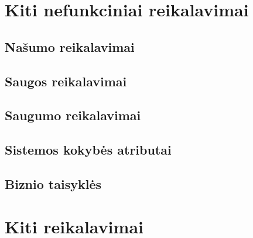\documentclass[oneside]{VUMIFPSkursinis}
\begin{document}
\section{Kiti nefunkciniai reikalavimai}
\subsection{Našumo reikalavimai}
\subsection{Saugos reikalavimai}
\subsection{Saugumo reikalavimai}
\subsection{Sistemos kokybės atributai}
\subsection{Biznio taisyklės}

\section{Kiti reikalavimai}
\end{document}
